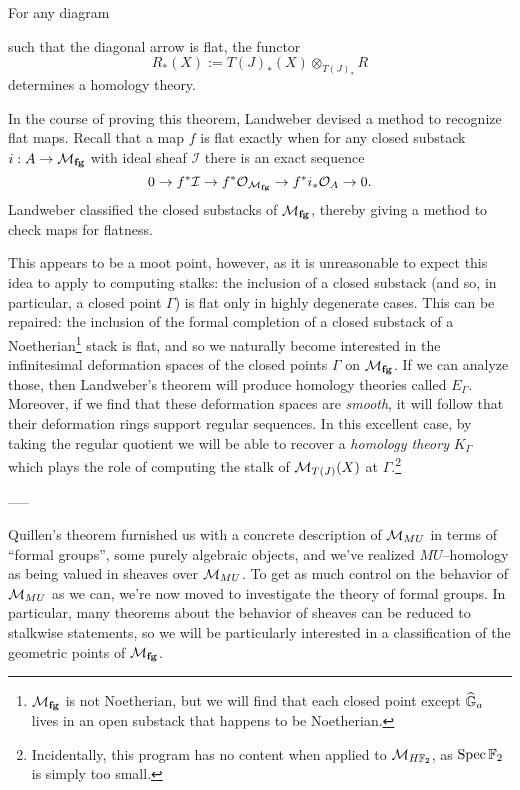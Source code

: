 \begin{theorem}
For any diagram
\begin{center}
\end{center}
such that the diagonal arrow is flat, the functor \[R_*(X) := T(J)_*(X) \otimes_{T(J)_*} R\] determines a homology theory. 
\end{theorem}

\noindent In the course of proving this theorem, Landweber devised a method to recognize flat maps.  Recall that a map $f$ is flat exactly when for any closed substack $i: A \to \mathcal{M}_{\mathbf{fg}}$ with ideal sheaf $\mathcal I$ there is an exact sequence \[0 \to f^* \mathcal I \to f^* \mathcal O_{\mathcal{M}_{\mathbf{fg}}} \to f^* i_* \mathcal O_A \to 0.\]  Landweber classified the closed substacks of $\mathcal{M}_{\mathbf{fg}}$, thereby giving a method to check maps for flatness.

This appears to be a moot point, however, as it is unreasonable to expect this idea to apply to computing stalks: the inclusion of a closed substack (and so, in particular, a closed point $\Gamma$) is flat only in highly degenerate cases.  This can be repaired: the inclusion of the formal completion of a closed substack of a Noetherian\footnote{$\mathcal{M}_{\mathbf{fg}}$ is not Noetherian, but we will find that each closed point except $\widehat{\mathbb G}_a$ lives in an open substack that happens to be Noetherian.} stack is flat, and so we naturally become interested in the infinitesimal deformation spaces of the closed points $\Gamma$ on $\mathcal{M}_{\mathbf{fg}}$.  If we can analyze those, then Landweber's theorem will produce homology theories called $E_\Gamma$.  Moreover, if we find that these deformation spaces are \emph{smooth}, it will follow that their deformation rings support regular sequences.  In this excellent case, by taking the regular quotient we will be able to recover a \emph{homology theory} $K_\Gamma$ which plays the role of computing the stalk of $\mathcal{M}_{T(J)}(X)$ at $\Gamma$.\footnote{Incidentally, this program has no content when applied to $\mathcal{M}_{H\mathbb F_2}$, as $\operatorname{Spec} \mathbb F_2$ is simply too small.}

-----

Quillen's theorem furnished us with a concrete description of $\mathcal{M}_{MU}$ in terms of ``formal groups'', some purely algebraic objects, and we've realized $MU$--homology as being valued in sheaves over $\mathcal{M}_{MU}$.  To get as much control on the behavior of $\mathcal{M}_{MU}$ as we can, we're now moved to investigate the theory of formal groups.  In particular, many theorems about the behavior of sheaves can be reduced to stalkwise statements, so we will be particularly interested in a classification of the geometric points of $\mathcal{M}_{\mathbf{fg}}$.


